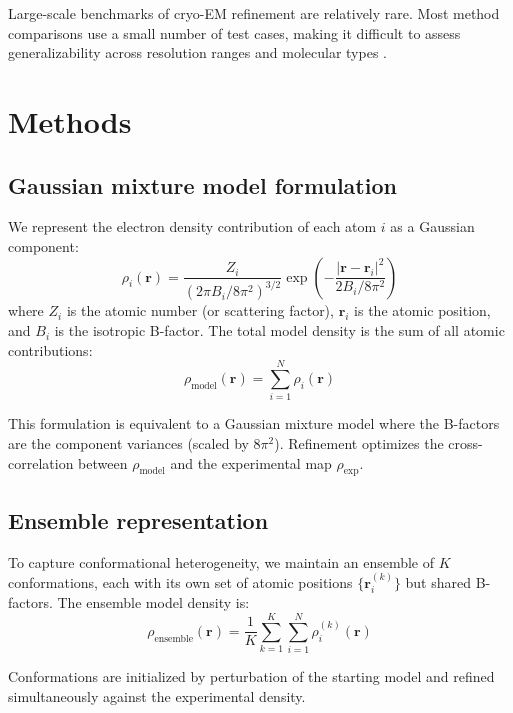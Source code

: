 \documentclass[11pt]{article}
\begin{document}
Large-scale benchmarks of cryo-EM refinement are relatively rare. Most method comparisons use a small number of test cases, making it difficult to assess generalizability across resolution ranges and molecular types \citep{nicholls2018}.

\section{Methods}

\subsection{Gaussian mixture model formulation}

We represent the electron density contribution of each atom $i$ as a Gaussian component:
\begin{equation}
\rho_i(\mathbf{r}) = \frac{Z_i}{(2\pi B_i / 8\pi^2)^{3/2}} \exp\left(-\frac{|\mathbf{r} - \mathbf{r}_i|^2}{2B_i / 8\pi^2}\right)
\end{equation}
where $Z_i$ is the atomic number (or scattering factor), $\mathbf{r}_i$ is the atomic position, and $B_i$ is the isotropic B-factor. The total model density is the sum of all atomic contributions:
\begin{equation}
\rho_{\text{model}}(\mathbf{r}) = \sum_{i=1}^{N} \rho_i(\mathbf{r})
\end{equation}

This formulation is equivalent to a Gaussian mixture model where the B-factors are the component variances (scaled by $8\pi^2$). Refinement optimizes the cross-correlation between $\rho_{\text{model}}$ and the experimental map $\rho_{\text{exp}}$.

\subsection{Ensemble representation}

To capture conformational heterogeneity, we maintain an ensemble of $K$ conformations, each with its own set of atomic positions $\{\mathbf{r}_i^{(k)}\}$ but shared B-factors. The ensemble model density is:
\begin{equation}
\rho_{\text{ensemble}}(\mathbf{r}) = \frac{1}{K}\sum_{k=1}^{K}\sum_{i=1}^{N} \rho_i^{(k)}(\mathbf{r})
\end{equation}

Conformations are initialized by perturbation of the starting model and refined simultaneously against the experimental density.
\end{document}
